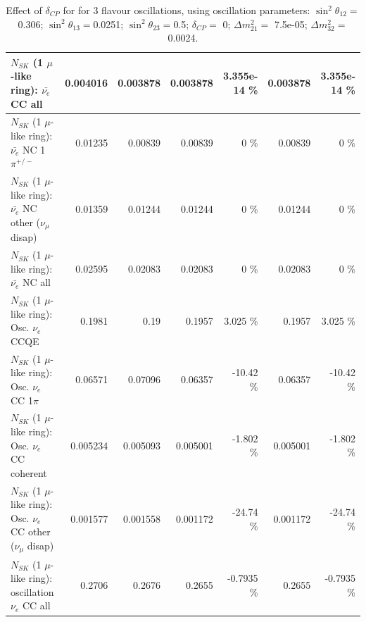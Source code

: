 \begin{table}
\begin{tabular}{| l | r | r | r  r | r  r |}
                            $N_{SK}$ (1 $\mu$-like ring): $\bar{\nu_{e}}$ CC all &        0.004016 &        0.003878 &        0.003878 & 3.355e-14 \%  &        0.003878 & 3.355e-14 \%  \\ 
\hline
                     $N_{SK}$ (1 $\mu$-like ring): $\bar{\nu_e}$ NC 1$\pi^{+/-}$ &         0.01235 &         0.00839 &         0.00839 &        0 \%  &         0.00839 &        0 \%  \\ 
          $N_{SK}$ (1 $\mu$-like ring): $\bar{\nu_e}$ NC other ($\nu_\mu$ disap) &         0.01359 &         0.01244 &         0.01244 &        0 \%  &         0.01244 &        0 \%  \\ 
                            $N_{SK}$ (1 $\mu$-like ring): $\bar{\nu_{e}}$ NC all &         0.02595 &         0.02083 &         0.02083 &        0 \%  &         0.02083 &        0 \%  \\ 
\hline
\hline
\hline
                                 $N_{SK}$ (1 $\mu$-like ring): Osc. $\nu_e$ CCQE &          0.1981 &            0.19 &          0.1957 &    3.025 \%  &          0.1957 &    3.025 \%  \\ 
                            $N_{SK}$ (1 $\mu$-like ring): Osc. $\nu_e$ CC 1$\pi$ &         0.06571 &         0.07096 &         0.06357 &   -10.42 \%  &         0.06357 &   -10.42 \%  \\ 
                          $N_{SK}$ (1 $\mu$-like ring): Osc. $\nu_e$ CC coherent &        0.005234 &        0.005093 &        0.005001 &   -1.802 \%  &        0.005001 &   -1.802 \%  \\ 
           $N_{SK}$ (1 $\mu$-like ring): Osc. $\nu_e$ CC other ($\nu_\mu$ disap) &        0.001577 &        0.001558 &        0.001172 &   -24.74 \%  &        0.001172 &   -24.74 \%  \\ 
                        $N_{SK}$ (1 $\mu$-like ring): oscillation $\nu_e$ CC all &          0.2706 &          0.2676 &          0.2655 &  -0.7935 \%  &          0.2655 &  -0.7935 \%  \\ 
\hline
\hline
\end{tabular}
\caption{ Effect of $\delta_{CP}$ for for 3 flavour oscillations, using oscillation parameters:  $\sin^2\theta_{12} = $0.306; $\sin^2\theta_{13} = $0.0251; $\sin^2\theta_{23} = $0.5; $\delta_{CP} = $        0; $\Delta m^2_{21} = $    7.5e-05; $\Delta m^2_{32} = $    0.0024. }
\label{tab:num_deltacp_1RmuT_3f_osc_t13:0.0251}
\end{table}
\clearpage

